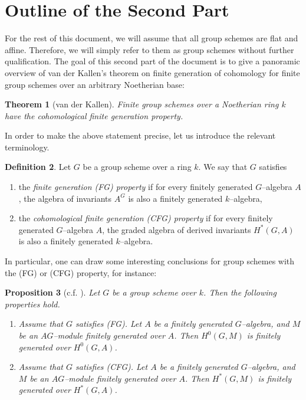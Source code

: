 \documentclass{article}
\theoremstyle{plain}
\newtheorem{Th}{Theorem}[section]
\newtheorem{Prop}[Th]{Proposition}
\theoremstyle{definition}
\newtheorem{Def}[Th]{Definition}
\begin{document}
\section{Outline of the Second Part}

For the rest of this document, we will assume that all group schemes are flat and affine. Therefore, we will simply refer to them as group schemes without further qualification. The goal of this second part of the document is to give a panoramic overview of van der Kallen's theorem \cite{vdK23} on finite generation of cohomology for finite group schemes over an arbitrary Noetherian base: 

\begin{Th}[van der Kallen]
    Finite group schemes over a Noetherian ring $k$ have the \textit{cohomological finite generation property}.
\end{Th}

In order to make the above statement precise, let us introduce the relevant terminology. 

\begin{Def}
        Let $G$ be a group scheme over a ring $k$. We say that $G$ satisfies 
        \begin{enumerate}
            \item the \textit{finite generation (FG) property} if for every finitely generated $G$--algebra $A$, the algebra of invariants $A^G$ is also a finitely generated $k$--algebra, 

            \item the \textit{cohomological finite generation (CFG) property}  if for every finitely generated $G$--algebra $A$, the graded algebra of derived invariants $H^*(G, A)$ is also a finitely generated $k$--algebra.
        \end{enumerate}
\end{Def}


In particular, one can draw some interesting conclusions for group schemes with the (FG) or (CFG) property, for instance:  


\begin{Prop}[c.f. \cite{TvdK10}]\label{Prop: CFG implies finite genarion of modules}
    Let $G$ be a group scheme over $k$. Then the following properties hold. 
    \begin{enumerate}
        \item Assume that $G$ satisfies (FG). Let $A$ be a finitely generated $G$--algebra, and $M$ be an $AG$--module finitely generated over $A$. Then $H^0(G,M)$ is finitely generated over $H^0(G,A)$. 
        \item Assume that $G$ satisfies (CFG). Let $A$ be a finitely generated $G$--algebra, and $M$ be an $AG$--module finitely generated over $A$. Then $H^\ast(G,M)$ is finitely generated over $H^\ast(G,A)$. 
    \end{enumerate}
\end{Prop}
\end{document}
